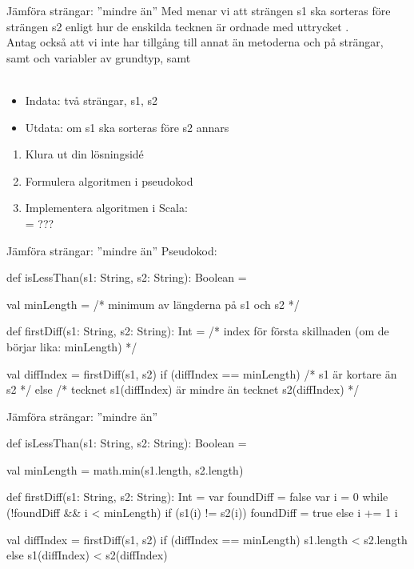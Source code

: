 \begin{Slide}{Jämföra strängar: ''mindre än''}\SlideFontSmall
Med  menar vi att strängen s1 ska sorteras före strängen s2 enligt hur de enskilda tecknen är ordnade med uttrycket . \\
Antag också att vi inte har tillgång till annat än metoderna  och  på strängar, samt   och variabler av grundtyp, samt 
\\\\
\begin{itemize}
\item Indata: två strängar, s1, s2
\item Utdata:  om s1 ska sorteras före s2 annars 
\end{itemize}
\begin{enumerate}
\item Klura ut din lösningsidé
\item Formulera algoritmen i pseudokod
\item Implementera algoritmen i Scala: \\ = ???
\end{enumerate}
\end{Slide}

\begin{Slide}{Jämföra strängar: ''mindre än''}\SlideFontSmall
Pseudokod:
\begin{Code}
def isLessThan(s1: String, s2: String): Boolean = {

  val minLength = /* minimum av längderna på s1 och s2 */

  def firstDiff(s1: String, s2: String): Int =
    /* index för första skillnaden (om de börjar lika: minLength) */

  val diffIndex = firstDiff(s1, s2)
  if (diffIndex == minLength) /* s1 är kortare än s2 */
  else /* tecknet s1(diffIndex) är mindre än tecknet s2(diffIndex) */
}
\end{Code}
\end{Slide}

\begin{Slide}{Jämföra strängar: ''mindre än''}\SlideFontSmall
\begin{Code}
def isLessThan(s1: String, s2: String): Boolean = {

  val minLength = math.min(s1.length, s2.length)

  def firstDiff(s1: String, s2: String): Int = {
    var foundDiff = false
    var i = 0
    while (!foundDiff && i < minLength) {
      if (s1(i) != s2(i)) foundDiff = true
      else i += 1
    }
    i
  }

  val diffIndex = firstDiff(s1, s2)
  if (diffIndex == minLength) s1.length < s2.length
  else s1(diffIndex) < s2(diffIndex)
}
\end{Code}
\end{Slide}

